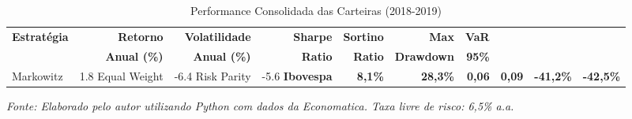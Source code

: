 \begin{table}[H]
\centering
\caption{Performance Consolidada das Carteiras (2018-2019)}
\begin{tabular}{|l|r|r|r|r|r|r|}
\hline
\textbf{Estratégia} & \textbf{Retorno} & \textbf{Volatilidade} & \textbf{Sharpe} & \textbf{Sortino} & \textbf{Max} & \textbf{VaR} \\
& \textbf{Anual (\%)} & \textbf{Anual (\%)} & \textbf{Ratio} & \textbf{Ratio} & \textbf{Drawdown} & \textbf{95\%} \\
\hline
Markowitz & 1.8%
\hline
Equal Weight & -6.4%
\hline
Risk Parity & -5.6%
\hline
\textbf{Ibovespa} & \textbf{8,1\%} & \textbf{28,3\%} & \textbf{0,06} & \textbf{0,09} & \textbf{-41,2\%} & \textbf{-42,5\%} \\
\hline
\end{tabular}
\textit{Fonte: Elaborado pelo autor utilizando Python com dados da Economatica. Taxa livre de risco: 6,5\% a.a.}
\label{tab:portfolio_performance}
\end{table}
